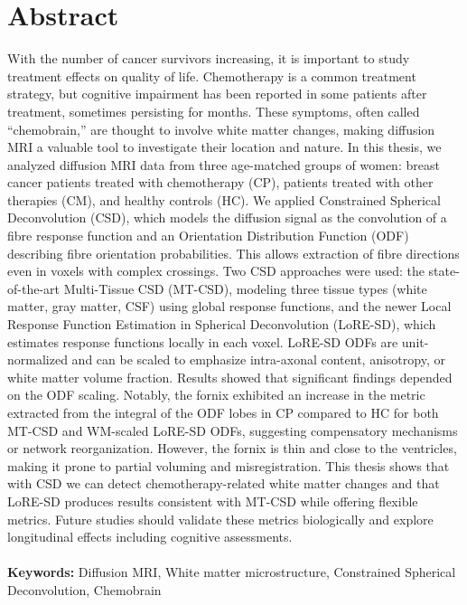 \documentclass{Configuration_Files/PoliMi3i_thesis}
\begin{document}
\chapter*{Abstract} 
With the number of cancer survivors increasing, it is important to study treatment effects on quality of life. Chemotherapy is a common treatment strategy, but cognitive impairment has been reported in some patients after treatment, sometimes persisting for months. These symptoms, often called “chemobrain,” are thought to involve white matter changes, making diffusion MRI a valuable tool to investigate their location and nature.
In this thesis, we analyzed diffusion MRI data from three age-matched groups of women: breast cancer patients treated with chemotherapy (CP), patients treated with other therapies (CM), and healthy controls (HC). We applied Constrained Spherical Deconvolution (CSD), which models the diffusion signal as the convolution of a fibre response function and an Orientation Distribution Function (ODF) describing fibre orientation probabilities. This allows extraction of fibre directions even in voxels with complex crossings.
Two CSD approaches were used: the state-of-the-art Multi-Tissue CSD (MT-CSD), modeling three tissue types (white matter, gray matter, CSF) using global response functions, and the newer Local Response Function Estimation in Spherical Deconvolution (LoRE-SD), which estimates response functions locally in each voxel. LoRE-SD ODFs are unit-normalized and can be scaled to emphasize intra-axonal content, anisotropy, or white matter volume fraction.
Results showed that significant findings depended on the ODF scaling. Notably, the fornix exhibited an increase in the metric extracted from the integral of the ODF lobes in CP compared to HC for both MT-CSD and WM-scaled LoRE-SD ODFs, suggesting compensatory mechanisms or network reorganization. However, the fornix is thin and close to the ventricles, making it prone to partial voluming and misregistration.
This thesis shows that with CSD we can detect chemotherapy-related white matter changes and that LoRE-SD produces results consistent with MT-CSD while offering flexible metrics. Future studies should validate these metrics biologically and explore longitudinal effects including cognitive assessments.\\
\\
\textbf{Keywords:} Diffusion MRI, White matter microstructure, Constrained Spherical Deconvolution, Chemobrain %

\end{document}
